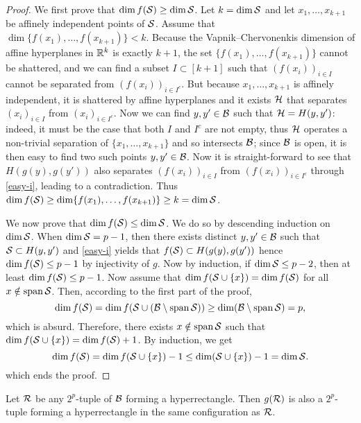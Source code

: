 \documentclass[twoside, 11pt]{article}
\begin{document}
\begin{proof} 
We first prove that $\dim f(\mathcal{S}) \geq \dim \mathcal{S}$. 
Let $k=\dim \mathcal{S}$ and let $x_1,\dots,x_{k+1}$ be affinely independent points of $\mathcal{S}$. Assume that $\dim \{f(x_1),\dots,f(x_{k+1})\} < k$. Because the Vapnik--Chervonenkis dimension of affine hyperplanes in $\mathbb{R}^k$ is exactly $k+1$, the set $ \{f(x_1),\dots,f(x_{k+1})\}$ cannot be shattered, and we can find a subset $I \subset [k+1]$ such that $(f(x_i))_{i\in I}$ cannot be separated from $(f(x_i))_{i\in I^c}$. But because $x_1,\dots,x_{k+1}$ is affinely independent, it is shattered by affine hyperplanes and it exists $\mathcal{H}$ that separates $(x_i)_{i\in I}$ from $(x_i)_{i \in I^c}$. Now we can find $y,y' \in \mathcal{B}$ such that $\mathcal{H} = H(y,y')$: indeed, it must be the case that both $I$ and $I^c$ are not empty, thus $\mathcal{H}$ operates a non-trivial separation of $\{x_1,\dots,x_{k+1}\}$ and so intersects $\mathcal{B}$; since $\mathcal{B}$ is open, it is then easy to find two such points $y,y' \in \mathcal{B}$. Now it is straight-forward to see that $H(g(y),g(y'))$ also separates $(f(x_i))_{i\in I}$ from $(f(x_i))_{i \in I^c}$ through \eqref{easy-i}, leading to a contradiction. Thus $\dim f(\mathcal{S}) \geq \dim \{f(x_1),\dots,f(x_{k+1})\} \geq k = \dim \mathcal{S}$.

We now prove that $\dim f(\mathcal{S}) \leq \dim \mathcal{S}$. We do so by descending induction on $\dim \mathcal{S}$.
When $\dim\mathcal{S} = p - 1$, then there exists distinct $y,y' \in \mathcal{B}$ such that $\mathcal{S} \subset H(y,y')$ and \eqref{easy-i} yields that $f(\mathcal{S}) \subset H(g(y),g(y'))$ hence $\dim f(\mathcal{S}) \leq p-1$ by injectivity of $g$. 
Now by induction, if $\dim \mathcal{S} \leq p-2$, then at least $\dim f(\mathcal{S}) \leq p - 1$. Now assume that $\dim f(\mathcal{S} \cup \{x\}) = \dim f(\mathcal{S})$  for all $x \notin \operatorname{span} \mathcal{S}$. Then, according to the first part of the proof,
$$
\dim f(\mathcal{S}) = \dim f(\mathcal{S} \cup (\mathcal{B} \setminus \operatorname{span} \mathcal{S})) \geq \dim(\mathcal{B} \setminus \operatorname{span} \mathcal{S}) = p,
$$
which is absurd. Therefore, there exists $x \notin \operatorname{span} \mathcal{S}$ such that $\dim f(\mathcal{S} \cup \{x\}) = \dim f(\mathcal{S}) + 1$. By induction, we get
$$
\dim f(\mathcal{S}) = \dim f(\mathcal{S} \cup \{x\}) - 1 \leq \dim (\mathcal{S} \cup \{x\}) - 1 = \dim \mathcal{S}.
$$
which ends the proof.
\end{proof}

\begin{lemma} \label{lem:rect} 
Let $\mathcal{R}$ be any $2^p$-tuple of $\mathcal{B}$ forming a hyperrectangle. Then $g(\mathcal{R})$ is also a $2^p$-tuple forming a hyperrectangle in the same configuration as $\mathcal{R}$.
\end{lemma}
\end{document}
